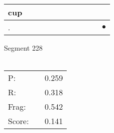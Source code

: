 \documentclass[landscape]{article}
\newcommand{\ssp}{\hspace{2pt}}
\newcommand{\mex}{\cellcolor{g}$\bullet$}
\begin{document}
\begin{tabular}{|l|p{10pt}|p{10pt}|p{10pt}|p{10pt}|p{10pt}|p{10pt}|p{10pt}|p{10pt}|p{10pt}|p{10pt}|}
\hline
\ssp cup \ssp&\hspace{2pt}&\hspace{2pt}&\hspace{2pt}&\hspace{2pt}&\hspace{2pt}&\hspace{2pt}&\hspace{2pt}&\hspace{2pt}&\hspace{2pt}&\hspace{2pt}\\
\hline
\ssp \cellcolor{ref9}. \ssp&\hspace{2pt}&\hspace{2pt}&\hspace{2pt}&\hspace{2pt}&\hspace{2pt}&\hspace{2pt}&\hspace{2pt}&\hspace{2pt}&\hspace{2pt}&\hspace{2pt}\mex\\
\hline
\end{tabular}

\vspace{6pt}
\noindent Segment 228\\\\
\noindent\begin{tabular}{lm{12pt}r}
\hline
P:&&0.259\\
R:&&0.318\\
Frag:&&0.542\\
Score:&&0.141\\
\end{tabular}

\newpage
\end{document}
